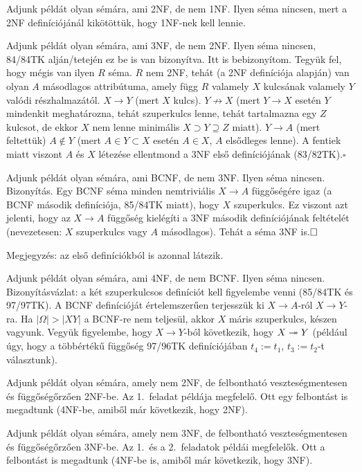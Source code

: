 \documentclass{article}
\begin{document}
Adjunk példát olyan sémára, ami 2NF, de nem 1NF.
\megoldas Ilyen séma nincsen, mert a 2NF definíciójánál kikötöttük, hogy
1NF-nek kell lennie.

Adjunk példát olyan sémára, ami 3NF, de nem 2NF.
\megoldas Ilyen séma nincsen, 84/84TK alján/tetején ez be is van bizonyítva. Itt is
bebizonyítom. Tegyük fel, hogy mégis van ilyen $R$ séma. $R$ nem 2NF, tehát
(a 2NF definíciója alapján) van olyan $A$ másodlagos attribútuma, amely
függ $R$ valamely $X$ kulcsának valamely $Y$ valódi részhalmazától.
$X\to Y$ (mert $X$ kulcs).
$Y\not\to X$ (mert $Y\to X$ esetén $Y$ mindenkit meghatározna,
tehát szuperkulcs lenne, tehát tartalmazna egy $Z$ kulcsot, de ekkor $X$ nem
lenne minimális $X\supset Y\supseteq Z$ miatt).
$Y\to A$ (mert feltettük)
$A\not\in Y$ (mert $A\in Y\subset X$ esetén $A\in X$, $A$ elsődleges lenne).
A fentiek miatt
viszont $A$ és $X$ létezése ellentmond a 3NF első definíciójának
(83/82TK).\hfill$\square$

Adjunk példát olyan sémára, ami BCNF, de nem 3NF.
\megoldas Ilyen séma nincsen. Bizonyítás. Egy BCNF séma minden nemtriviális
$X\to A$ függőségére
igaz (a BCNF második definíciója, 85/84TK miatt), hogy $X$ szuperkulcs. Ez
viszont azt jelenti, hogy az $X\to A$ függőség kielégíti a 3NF második
definíciójának feltételét (nevezetesen: $X$ szuperkulcs vagy $A$ másodlagos).
Tehát a séma 3NF is.$\hfill\square$

Megjegyzés: az első definíciókból is azonnal látszik.

Adjunk példát olyan sémára, ami 4NF, de nem BCNF.
\megoldas Ilyen séma nincsen. Bizonyításvázlat: a két szuperkulcsos
definíciót kell figyelembe venni (85/84TK és 97/97TK). A BCNF definícióját
értelemszerűen terjesszük ki $X\to A$-ról $X\to Y$-ra.
Ha $|\Omega|>|XY|$ a BCNF-re nem teljesül, akkor $X$ máris szuperkulcs,
készen vagyunk. Vegyük figyelembe, hogy $X\to Y$-ból következik, hogy
$X\twoheadrightarrow Y$ (például úgy, hogy a többértékű függőség 97/96TK definíciójában
$t_4:=t_1$, $t_3:=t_2$-t választunk).


Adjunk példát olyan sémára, amely nem 2NF, de felbontható veszteségmentesen
és függőségőrzően 2NF-be.
\megoldas Az 1.\ feladat példája megfelelő. Ott egy felbontást is megadtunk
(4NF-be, amiből már következik, hogy 2NF).

Adjunk példát olyan sémára, amely nem 3NF, de felbontható veszteségmentesen
és függőségőrzően 3NF-be.
\megoldas Az 1.\ és a 2.\ feladatok példái megfelelők. Ott a felbontást is
megadtunk (4NF-be is, amiből már következik, hogy 3NF).
\end{document}
